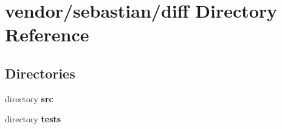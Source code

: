 \section{vendor/sebastian/diff Directory Reference}
\label{dir_a93c6864b2d099b944044b1677a4eda1}
\subsection*{Directories}
\begin{DoxyCompactItemize}
\item 
directory {\bf src}
\item 
directory {\bf tests}
\end{DoxyCompactItemize}
